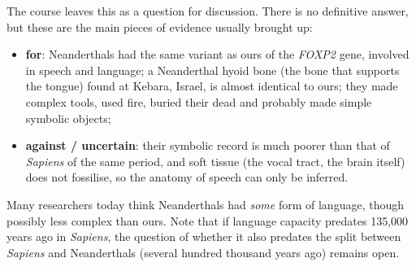 The course leaves this as a question for discussion. There is no definitive answer,
but these are the main pieces of evidence usually brought up:
\begin{itemize}[nosep]
  \item \textbf{for}: Neanderthals had the same variant as ours of the \emph{FOXP2} gene,
        involved in speech and language; a Neanderthal hyoid bone (the bone that
        supports the tongue) found at Kebara, Israel, is almost identical to ours; they
        made complex tools, used fire, buried their dead and probably made simple
        symbolic objects;
  \item \textbf{against / uncertain}: their symbolic record is much poorer than that of
        \emph{Sapiens} of the same period, and soft tissue (the vocal tract, the brain
        itself) does not fossilise, so the anatomy of speech can only be inferred.
\end{itemize}
Many researchers today think Neanderthals had \emph{some} form of language, though
possibly less complex than ours. Note that if language capacity predates 135{,}000
years ago in \emph{Sapiens}, the question of whether it also predates the split between
\emph{Sapiens} and Neanderthals (several hundred thousand years ago) remains open.

